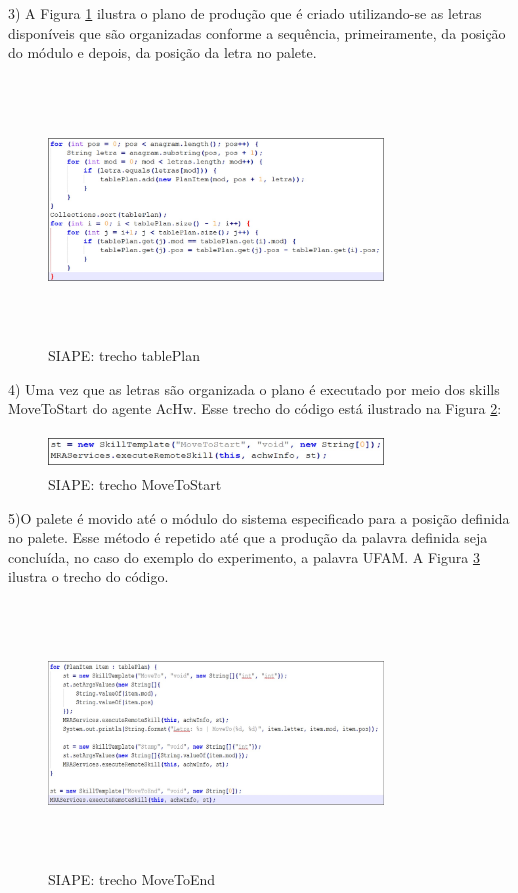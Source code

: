 \documentclass[10pt,letterpaper,twocolumn]{IEEEtran}
\begin{document}
	3) A Figura \ref{F150} ilustra o plano de produção que é criado utilizando-se as letras disponíveis 
	que são organizadas conforme a sequência, primeiramente, da posição do módulo e depois, da posição 
	da letra no palete.
	
	\begin{figure}[!h]
		\centering
		\includegraphics[width=8.9cm, height=7cm]{MeDSE_imagens/F150_criaPlano.jpg} 
		\caption{SIAPE: trecho tablePlan}
		\label{F150}
	\end{figure}
	
	4) Uma vez que as letras são organizada o plano é executado por meio dos skills MoveToStart do agente 
	AcHw. Esse trecho do código está ilustrado na Figura \ref{F151}:
	
	\begin{figure}[!h]
		\centering
		\includegraphics[width=8.9cm, height=1cm]{MeDSE_imagens/F151_MoveTo.jpg} 
		\caption{SIAPE: trecho MoveToStart}
		\label{F151}
	\end{figure}
	5)O palete é movido até o módulo do sistema especificado para a posição definida no palete. Esse método 
	é repetido até que a produção da palavra definida seja concluída, no caso do exemplo do experimento, a 
	palavra UFAM. A Figura \ref{F152} ilustra o trecho do código.
	
	\begin{figure}[!h]
		\centering
		\includegraphics[width=8.9cm, height=7cm]{MeDSE_imagens/F152_MoveToEnd.jpg} 
		\caption{SIAPE: trecho MoveToEnd}
		\label{F152}
	\end{figure}
	
\end{document}

